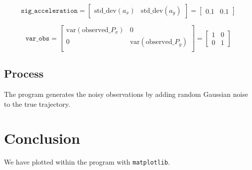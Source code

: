 \documentclass[12pt]{article}
\begin{document}
	\begin{equation}
			\mathtt{sig\_acceleration}=
			\begin{bmatrix}
				\mathrm{std\_dev}(a_x) & \mathrm{std\_dev}(a_y)
			\end{bmatrix}=
			\begin{bmatrix}
				0.1 & 0.1
			\end{bmatrix}
	\end{equation}

	\begin{equation}
			\mathtt{var\_obs}=
			\begin{bmatrix}
				\mathrm{var}(\mathrm{observed}\_P_x) & 0 \\
				0 & \mathrm{var}(\mathrm{observed}\_P_y) \\
			\end{bmatrix}=
			\begin{bmatrix}
				1 & 0 \\
				0 & 1
			\end{bmatrix}
	\end{equation}

	\subsection{Process}\label{sub:Process}
	The program generates the noisy observations by adding random Gaussian noise to the true trajectory.

	\section{Conclusion}
	We have plotted within the program with \texttt{matplotlib}.
\end{document}
